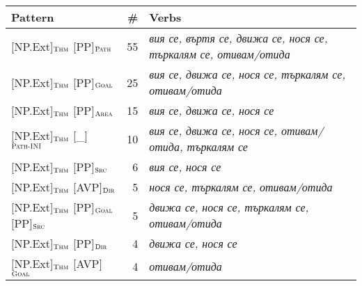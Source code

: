 \documentclass[output=paper,colorlinks,citecolor=brown]{langscibook}
\begin{document}
\begin{table}
   \begin{tabularx}{\textwidth}{lrQ}
  \lsptoprule
   Pattern & \# & Verbs \\ \midrule
{[NP.Ext]}$_{\text{\textsc{Thm}}}$ {[PP]}$_{\text{\textsc{Path}}}$ & 55 & \textit{вия се, въртя се, движа се, нося се, търкалям се, отивам\slash отида}\\ 
{[NP.Ext]}$_{\text{\textsc{Thm}}}$ {[PP]}$_{\text{\textsc{Goal}}}$ & 25 & \textit{вия се, движа се, нося се, търкалям се, отивам\slash отида}\\ 
{[NP.Ext]}$_{\text{\textsc{Thm}}}$ {[PP]}$_{\text{\textsc{Area}}}$ & 15 & \textit{вия се, движа се, нося се}\\ 
{[NP.Ext]}$_{\text{\textsc{Thm}}}$ {[\_]}$_{\text{\textsc{Path-INI}}}$& 10 & \textit{вия се, движа се, нося се, отивам\slash отида, търкалям се}\\ 
{[NP.Ext]}$_{\text{\textsc{Thm}}}$ {[PP]}$_{\text{\textsc{Src}}}$ & 6 & \textit{вия се, нося се}\\ 
{[NP.Ext]}$_{\text{\textsc{Thm}}}$ {[AVP]}$_{\text{\textsc{Dir}}}$ & 5 & \textit{нося се, търкалям се, отивам\slash отида}\\ 
{[NP.Ext]}$_{\text{\textsc{Thm}}}$ {[PP]}$_{\text{\textsc{Goal}}}$ {[PP]}$_{\text{\textsc{Src}}}$ & 5 & \textit{движа се, нося се, търкалям се, отивам\slash отида}\\ 
{[NP.Ext]}$_{\text{\textsc{Thm}}}$ {[PP]}$_{\text{\textsc{Dir}}}$ & 4 & \textit{движа се, нося се}\\ 
{[NP.Ext]}$_{\text{\textsc{Thm}}}$ {[AVP]}$_{\text{\textsc{Goal}}}$ & 4 & \textit{отивам\slash отида}\\ 

\end{tabularx}
\end{table}
\end{document}
